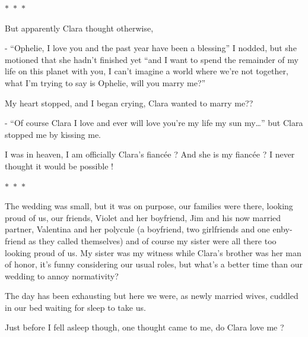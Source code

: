 \documentclass[hidelinks,12pt]{book}
\newcommand\sep{\begin{center}
  \boldmath $\ast$~$\ast$~$\ast$
\end{center}}
\begin{document}
\sep 

But apparently Clara thought otherwise, 

- “Ophelie, I love you and the past year have been a blessing” I nodded, but she motioned that she hadn't finished yet 
“and I want to spend the remainder of my life on this planet with you, I can't imagine a world where we're not 
together, what I'm trying to say is Ophelie, will you marry me?”\par 
\bigskip

My heart stopped, and I began crying, Clara wanted to marry me??\par 
\bigskip

- “Of course Clara I love and ever will love you're my life my sun my…” but Clara stopped me by kissing me.\par

I was in heaven, I am officially Clara's fiancée ? And she is my fiancée ? I never thought it would be possible !
\sep
The wedding was small, but it was on purpose, our families were there, looking proud of us, our friends, 
Violet and her boyfriend, Jim and his now married partner, Valentina and her polycule (a boyfriend, 
two girlfriends and one enby-friend as they called themselves) and of course my sister were all there too 
looking proud of us. My sister was my witness while Clara's brother was her man of honor, it's funny considering 
our usual roles, but what's a better time than our wedding to annoy normativity?\par 
\bigskip

The day has been exhausting but here we were, as newly married wives, cuddled in our bed waiting for sleep to take us.\par
\bigskip

Just before I fell asleep though, one thought came to me, do Clara love me ?
\end{document}
